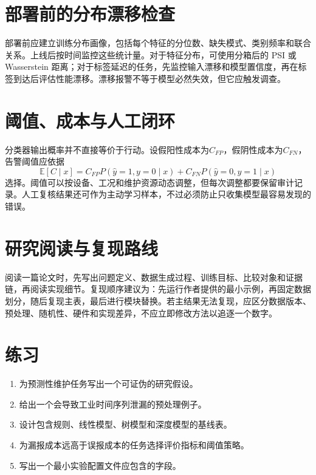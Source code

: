 \section{部署前的分布漂移检查}
部署前应建立训练分布画像，包括每个特征的分位数、缺失模式、类别频率和联合关系。上线后按时间监控这些统计量。对于特征分布，可使用分箱后的 PSI 或 Wasserstein 距离；对于标签延迟的任务，先监控输入漂移和模型置信度，再在标签到达后评估性能漂移。漂移报警不等于模型必然失效，但它应触发调查。

\section{阈值、成本与人工闭环}
分类器输出概率并不直接等价于行动。设假阳性成本为$C_{FP}$，假阴性成本为$C_{FN}$，告警阈值应依据
\begin{equation}
 \mathbb{E}[C\mid x]=C_{FP}P(\hat y=1,y=0\mid x)+C_{FN}P(\hat y=0,y=1\mid x)
\end{equation}
选择。阈值可以按设备、工况和维护资源动态调整，但每次调整都要保留审计记录。人工复核结果还可作为主动学习样本，不过必须防止只收集模型最容易发现的错误。

\section{研究阅读与复现路线}
阅读一篇论文时，先写出问题定义、数据生成过程、训练目标、比较对象和证据链，再阅读实现细节。复现顺序建议为：先运行作者提供的最小示例，再固定数据划分，随后复现主表，最后进行模块替换。若主结果无法复现，应区分数据版本、预处理、随机性、硬件和实现差异，不应立即修改方法以追逐一个数字。

\section{练习}
\begin{enumerate}[label=\arabic*.]
 \item 为预测性维护任务写出一个可证伪的研究假设。
 \item 给出一个会导致工业时间序列泄漏的预处理例子。
 \item 设计包含规则、线性模型、树模型和深度模型的基线表。
 \item 为漏报成本远高于误报成本的任务选择评价指标和阈值策略。
 \item 写出一个最小实验配置文件应包含的字段。
\end{enumerate}